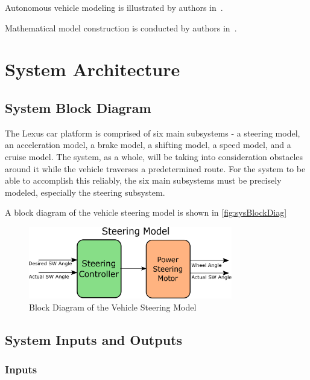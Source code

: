 \documentclass[12pt]{article} %
\begin{document}
Autonomous vehicle modeling is illustrated by authors in~\cite{Wang2021}.

Mathematical model construction is conducted by authors in~\cite{Donjaroennon2021}.

\section{System Architecture}
\subsection{System Block Diagram}
The Lexus car platform is comprised of six main subsystems - a steering model, an acceleration model, a brake model, a shifting model, a speed model, and a cruise model. The system, as a whole, will be taking into consideration obstacles around it while the vehicle traverses a predetermined route. For the system to be able to accomplish this reliably, the six main subsystems must be precisely modeled, especially the steering subsystem. 

A block diagram of the vehicle steering model is shown in \autoref{fig:sysBlockDiag}
\begin{figure}[b]
    \centering
    \captionsetup{justification=centering, margin=3cm}
    \includegraphics[width=3.5in]{figs/inkscape/steeringModelArchitecture}
    \caption{Block Diagram of the Vehicle Steering Model}
    \label{fig:sysBlockDiag}
\end{figure}

\subsection{System Inputs and Outputs}
\subsubsection{Inputs}
\end{document}
